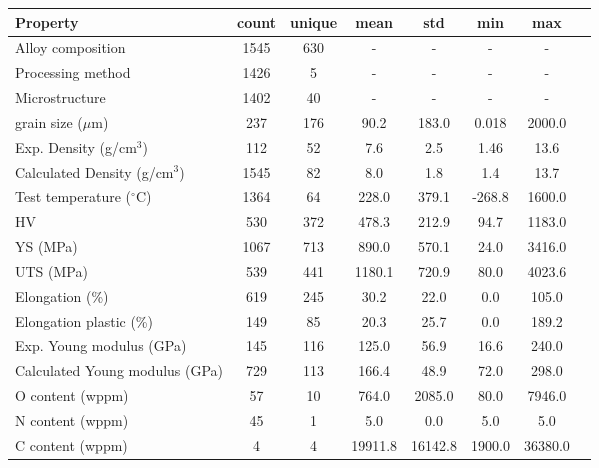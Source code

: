 \begin{tabular}{lccccccc}
\toprule
Property & count & unique & mean & std & min & max \\
\midrule
Alloy composition & 1545 & 630 & - & - & - & - \\
Processing method & 1426 & 5 & - & - & - & - \\
Microstructure & 1402 & 40 & - & - & - & - \\
grain size ($\mu$m) & 237 & 176 & 90.2 & 183.0 & 0.018 & 2000.0 \\
Exp. Density (g/cm$^3$) & 112 & 52 & 7.6 & 2.5 & 1.46 & 13.6 \\
Calculated Density (g/cm$^3$) & 1545 & 82 & 8.0 & 1.8 & 1.4 & 13.7 \\
Test temperature ($^\circ$C) & 1364 & 64 & 228.0 & 379.1 & -268.8 & 1600.0 \\
HV & 530 & 372 & 478.3 & 212.9 & 94.7 & 1183.0 \\
YS (MPa) & 1067 & 713 & 890.0 & 570.1 & 24.0 & 3416.0 \\
UTS (MPa) & 539 & 441 & 1180.1 & 720.9 & 80.0 & 4023.6 \\
Elongation (\%) & 619 & 245 & 30.2 & 22.0 & 0.0 & 105.0 \\
Elongation plastic (\%) & 149 & 85 & 20.3 & 25.7 & 0.0 & 189.2 \\
Exp. Young modulus (GPa) & 145 & 116 & 125.0 & 56.9 & 16.6 & 240.0 \\
Calculated Young modulus (GPa) & 729 & 113 & 166.4 & 48.9 & 72.0 & 298.0 \\
O content (wppm) & 57 & 10 & 764.0 & 2085.0 & 80.0 & 7946.0 \\
N content (wppm) & 45 & 1 & 5.0 & 0.0 & 5.0 & 5.0 \\
C content (wppm) & 4 & 4 & 19911.8 & 16142.8 & 1900.0 & 36380.0 \\
\bottomrule
\end{tabular}
